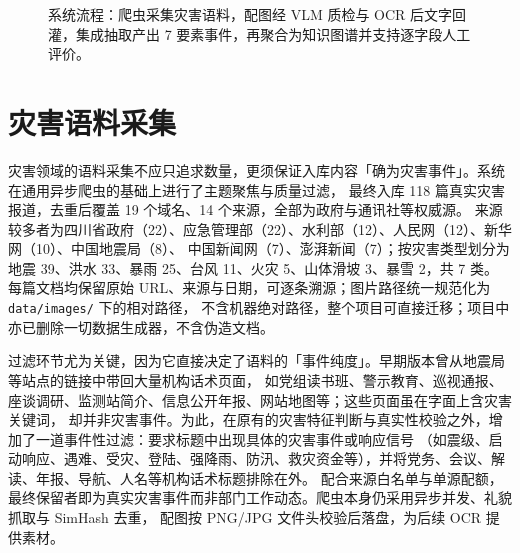 \documentclass[11pt,a4paper]{ctexart}
\begin{document}
\begin{figure}[ht]
\centering
{}
\caption{系统流程：爬虫采集灾害语料，配图经 VLM 质检与 OCR 后文字回灌，集成抽取产出 7 要素事件，再聚合为知识图谱并支持逐字段人工评价。}
\label{fig:arch}
\end{figure}


\section{灾害语料采集}

灾害领域的语料采集不应只追求数量，更须保证入库内容「确为灾害事件」。系统在通用异步爬虫的基础上进行了主题聚焦与质量过滤，
最终入库 118 篇真实灾害报道，去重后覆盖 19 个域名、14 个来源，全部为政府与通讯社等权威源。
来源较多者为四川省政府（22）、应急管理部（22）、水利部（12）、人民网（12）、新华网（10）、中国地震局（8）、
中国新闻网（7）、澎湃新闻（7）；按灾害类型划分为地震 39、洪水 33、暴雨 25、台风 11、火灾 5、山体滑坡 3、暴雪 2，共 7 类。
每篇文档均保留原始 URL、来源与日期，可逐条溯源；图片路径统一规范化为 \texttt{data/images/} 下的相对路径，
不含机器绝对路径，整个项目可直接迁移；项目中亦已删除一切数据生成器，不含伪造文档。

过滤环节尤为关键，因为它直接决定了语料的「事件纯度」。早期版本曾从地震局等站点的链接中带回大量机构话术页面，
如党组读书班、警示教育、巡视通报、座谈调研、监测站简介、信息公开年报、网站地图等；这些页面虽在字面上含灾害关键词，
却并非灾害事件。为此，在原有的灾害特征判断与真实性校验之外，增加了一道事件性过滤：要求标题中出现具体的灾害事件或响应信号
（如震级、启动响应、遇难、受灾、登陆、强降雨、防汛、救灾资金等），并将党务、会议、解读、年报、导航、人名等机构话术标题排除在外。
配合来源白名单与单源配额，最终保留者即为真实灾害事件而非部门工作动态。爬虫本身仍采用异步并发、礼貌抓取与 SimHash 去重，
配图按 PNG/JPG 文件头校验后落盘，为后续 OCR 提供素材。
\end{document}
